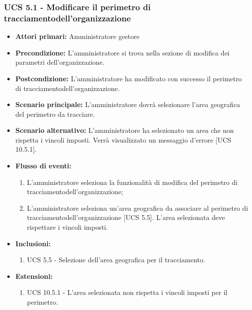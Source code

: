 \subsubsection{UCS 5.1 - Modificare il perimetro di tracciamentodell'organizzazione}%
\begin{itemize}
    \item \textbf{Attori primari:} Amministratore gestore
    \item \textbf{Precondizione:} L'amministratore si trova nella sezione di modifica dei parametri dell'organizzazione.
    \item \textbf{Postcondizione:} L'amministratore ha modificato con successo il perimetro di tracciamentodell'organizzazione.
    \item \textbf{Scenario principale:} L'amministratore dovrà selezionare l'area geografica del perimetro da tracciare.
     \item \textbf{Scenario alternativo:} L'amministratore ha selezionato un area che non rispetta i vincoli imposti. Verrà visualizzato un messaggio d'errore [UCS 10.5.1].
    \item \textbf{Flusso di eventi:}
    \begin{enumerate}%
        \item L'amministratore seleziona la funzionalità di modifica del perimetro di tracciamentodell'organizzazione;
        \item L'amministratore seleziona un'area geografica da associare al perimetro di tracciamentodell'organizzazione [UCS 5.5]. L'area selezionata deve rispettare i vincoli imposti.
    \end{enumerate}
    \item \textbf{Inclusioni:}
    \begin{enumerate}
        \item UCS 5.5 - Selezione dell'area geografica per il tracciamento.
    \end{enumerate}
    \item \textbf{Estensioni:}
    \begin{enumerate}
        \item UCS 10.5.1 - L'area selezionata non rispetta i vincoli imposti per il perimetro.
    \end{enumerate}
\end{itemize}

